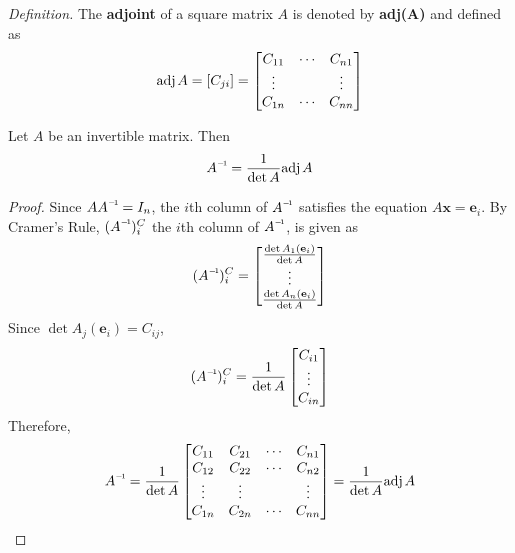 \textit{Definition.} The \textbf{adjoint} of a square matrix $A$ is denoted by \textbf{adj(A)} and defined as \begin{equation*}
	\text{adj}\hspace{.3ex}{A} = [C_{ji}] = \begin{bmatrix}
		C_{11} & \cdots & C_{n1} \\
		\vdots & & \vdots \\
		C_{1n} & \cdots & C_{nn}
	\end{bmatrix}
\end{equation*}

\begin{theorem}
	Let $ A $ be an invertible \nbyn matrix. Then $$ \inv{A}=\dfrac{1}{\det{A}}\adj{A} $$
\end{theorem}
\begin{proof}
	Since $A\inv{A} = I_n$, the $i$th column of $\inv{A}$ satisfies the equation $A\textbf{x} = \textbf{e}_i$. By Cramer's Rule, $(\inv{A})_i^C$ the $i$th column of $\inv{A}$, is given as \begin{equation*}
		(\inv{A})_i^C = \begin{bmatrix}
			\frac{\det{A_1(\textbf{e}_i)}}{\det{A}} \\
			\vdots \\
			\frac{\det{A_n(\textbf{e}_i)}}{\det{A}}
		\end{bmatrix}
	\end{equation*}
	Since $\det{A_j(\textbf{e}_i)} = C_{ij}$, \begin{equation*}
		(\inv{A})_i^C = \frac{1}{\det{A}}\begin{bmatrix}
			C_{i1} \\ \vdots \\ C_{in}
		\end{bmatrix}
	\end{equation*}
	Therefore, \begin{equation*}
		\inv{A} = \frac{1}{\det{A}}\begin{bmatrix}
			C_{11} & C_{21} & \cdots & C_{n1} \\
			C_{12} & C_{22} & \cdots & C_{n2} \\
			\vdots & \vdots &        & \vdots \\
			C_{1n} & C_{2n} & \cdots & C_{nn}
		\end{bmatrix} = \frac{1}{\det{A}}\adj{A}
	\end{equation*}
\end{proof}

